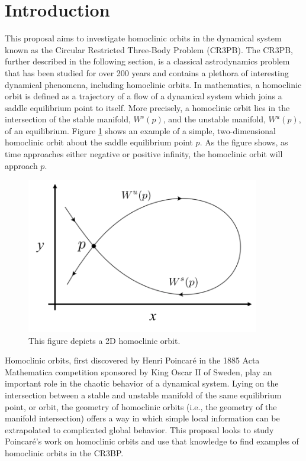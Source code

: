 \documentclass[11pt]{article} %
\title{\color{red}{We need a title, playa}}
\author{Luke Bury \& Don Kuettel}
\begin{document}
\maketitle
\section*{Introduction}
This proposal aims to investigate homoclinic orbits in the dynamical system known as the Circular Restricted Three-Body Problem (CR3PB). The CR3PB, further described in the following section, is a classical astrodynamics problem that has been studied for over 200 years and contains a plethora of interesting dynamical phenomena, including homoclinic orbits. In mathematics, a homoclinic orbit is defined as a trajectory of a flow of a dynamical system which joins a saddle equilibrium point to itself. More precisely, a homoclinic orbit lies in the intersection of the stable manifold, $W^s(p)$, and the unstable manifold, $W^u(p)$, of an equilibrium. Figure \ref{f:homoclinic_example} shows an example of a simple, two-dimensional homoclinic orbit about the saddle equilibrium point $p$. As the figure shows, as time approaches either negative or positive infinity, the homoclinic orbit will approach $p$. 

\begin{figure}[H]
    \centering
    \includegraphics[width=4in]{homoclinic_orbit.png}
    \caption{This figure depicts a 2D homoclinic orbit.}
    \label{f:homoclinic_example}
\end{figure}

Homoclinic orbits, first discovered by Henri Poincar\'{e} in the 1885 Acta Mathematica competition sponsored by King Oscar II of Sweden, play an important role in the chaotic behavior of a dynamical system. Lying on the intersection between a stable and unstable manifold of the same equilibrium point, or orbit, the geometry of homoclinic orbits (i.e., the geometry of the manifold intersection) offers a way in which simple local information can be extrapolated to complicated global behavior. This proposal looks to study Poincar\'{e}'s work on homoclinic orbits and use that knowledge to find examples of homoclinic orbits in the CR3BP.
\end{document}
